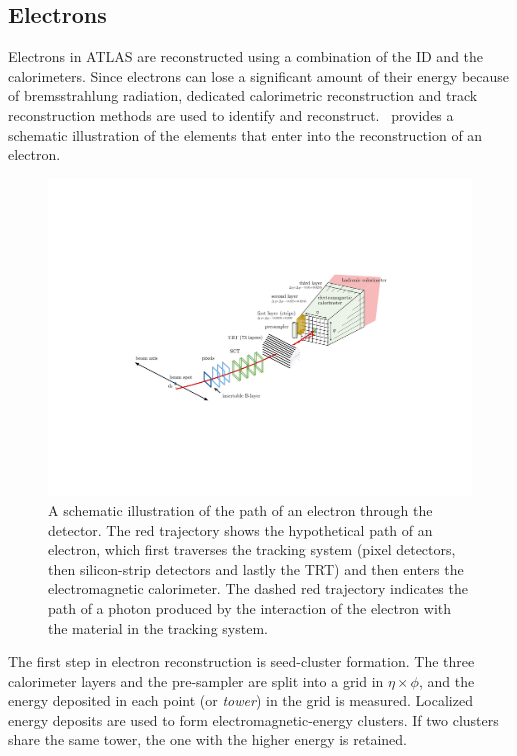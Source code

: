 \subsection{Electrons}
Electrons in ATLAS are reconstructed using a combination of the ID and the calorimeters. Since electrons can lose a significant amount of their energy because of bremsstrahlung radiation, dedicated calorimetric reconstruction and track reconstruction methods are used to identify and reconstruct.~ provides a schematic illustration of the elements that enter into the reconstruction of an electron.


\begin{figure}[!ht]
    \centering
    \includegraphics[width=0.8\linewidth]{figures//experiment/electronReco.pdf}
    \caption{A schematic illustration of the path of an electron through the detector. The red trajectory shows the hypothetical path of an electron, which first traverses the tracking system (pixel detectors, then silicon-strip detectors and lastly the TRT) and then enters the electromagnetic calorimeter. The dashed red trajectory indicates the path of a photon produced by the interaction of the electron with the material in the tracking system.~\cite{PERF-2017-01}}
    \label{fig:el-reco}
\end{figure}

The first step in electron reconstruction is seed-cluster formation. The three calorimeter layers and the pre-sampler are split into a grid in $\eta\times\phi$, and the energy deposited in each point (or \textit{tower}) in the grid is measured. Localized energy deposits are used to form electromagnetic-energy clusters. If two clusters share the same tower, the one with the higher energy is retained.

